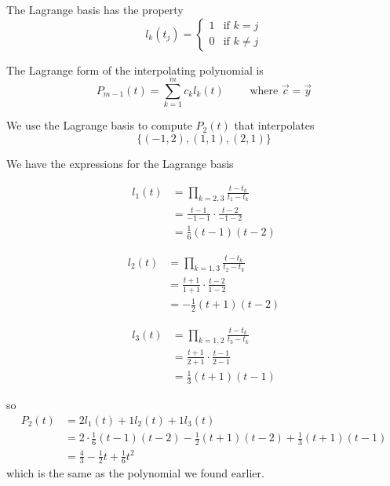 \begin{remark}
    The Lagrange basis has the property \[
        l_k(t_j) = \begin{cases}
            1 & \text{if } k = j    \\
            0 & \text{if } k \neq j
        \end{cases}
    \]
\end{remark}

The Lagrange form of the interpolating polynomial is \[
    P_{m-1}(t) = \sum_{k=1}^{m} c_k l_k(t) \qquad\text{ where } \vec{c} = \vec{y}
\]

\begin{example}
    We use the Lagrange basis to compute \( P_2(t) \) that interpolates \[
        \{ (-1, 2), (1, 1), (2, 1) \}
    \]

    We have the expressions for the Lagrange basis

    \begin{minipage}[t]{0.3\linewidth}
        \begin{align*}
            l_1(t)
             & = \prod_{k=2,3} \frac{t - t_k}{t_1 - t_k}
            \\
             & = \frac{t - 1}{-1 - 1} \cdot \frac{t - 2}{-1 - 2}
            \\
             & = \frac{1}{6} (t - 1)(t - 2)
        \end{align*}
    \end{minipage}
    \begin{minipage}[t]{0.3\linewidth}
        \begin{align*}
            l_2(t)
             & = \prod_{k=1,3} \frac{t - t_k}{t_2 - t_k}
            \\
             & = \frac{t + 1}{1 + 1} \cdot \frac{t - 2}{1 - 2}
            \\
             & = -\frac{1}{2} (t + 1)(t - 2)
        \end{align*}
    \end{minipage}
    \begin{minipage}[t]{0.3\linewidth}
        \begin{align*}
            l_3(t)
             & = \prod_{k=1,2} \frac{t - t_k}{t_3 - t_k}
            \\
             & = \frac{t + 1}{2 + 1} \cdot \frac{t - 1}{2 - 1}
            \\
             & = \frac{1}{3} (t + 1)(t - 1)
        \end{align*}
    \end{minipage}

    so \begin{align*}
        P_2(t)
         & = 2l_1(t) + 1l_2(t) + 1l_3(t)
        \\
         & = 2 \cdot \frac{1}{6} (t - 1)(t - 2) - \frac{1}{2} (t + 1)(t - 2) + \frac{1}{3} (t + 1)(t - 1)
        \\
         & = \frac{4}{3} - \frac{1}{2}t + \frac{1}{6}t^2
    \end{align*}
    which is the same as the polynomial we found earlier.
\end{example}

